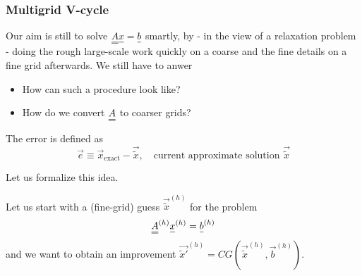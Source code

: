 \subsubsection{Multigrid V-cycle}
Our aim is still to solve $\mat{A}\vec{x} = \vec{b}$ smartly, by - in the view
of a relaxation problem - doing the rough large-scale work quickly on a coarse
and the fine details on a fine grid afterwards. We still have to anwer
\begin{itemize}
    \item How can such a procedure look like?
    \item How do we convert $\mat{A}$ to coarser grids?
\end{itemize}

The error is defined as
\begin{equation}
    \vec{e} \equiv \vec{x}_{\text{exact}} - \vec{\tilde{x}}, \quad \text{current approximate solution } \vec{\tilde{x}}
\end{equation}



Let us formalize this idea.

Let us start with a (fine-grid) guess $\vec{\tilde{x}}^{(h)}$ for the problem
\begin{equation}
    \mat{A}^{(h)} \vec{x}^{(h)} = \vec{b}^{(h)}
\end{equation}
and we want to obtain an improvement $\vec{\tilde{x}'}^{(h)} = CG(\vec{\tilde{x}}^{(h)}, \vec{b}^{(h)})$.

